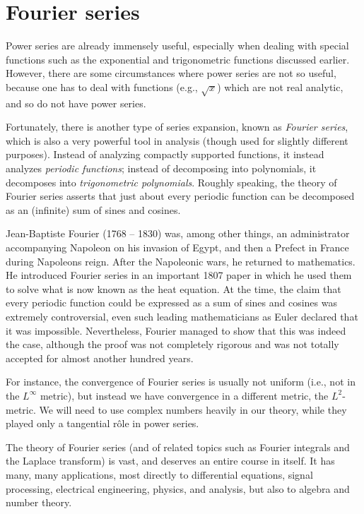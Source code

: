 \chapter{Fourier series}\label{ch 5}

\begin{note}
    Power series are already immensely useful, especially when dealing with special functions such as the exponential and trigonometric functions discussed earlier.
    However, there are some circumstances where power series are not so useful, because one has to deal with functions (e.g., \(\sqrt{x}\)) which are not real analytic, and so do not have power series.
\end{note}

\begin{note}
    Fortunately, there is another type of series expansion, known as \emph{Fourier series}, which is also a very powerful tool in analysis
    (though used for slightly different purposes).
    Instead of analyzing compactly supported functions, it instead analyzes \emph{periodic functions};
    instead of decomposing into polynomials, it decomposes into \emph{trigonometric polynomials}.
    Roughly speaking, the theory of Fourier series asserts that just about every periodic function can be decomposed as an (infinite) sum of sines and cosines.
\end{note}

\begin{remark}\label{5.0.1}
    Jean-Baptiste Fourier (1768 -- 1830) was, among other things, an administrator accompanying Napoleon on his invasion of Egypt, and then a Prefect in France during Napoleons reign.
    After the Napoleonic wars, he returned to mathematics.
    He introduced Fourier series in an important 1807 paper in which he used them to solve what is now known as the heat equation.
    At the time, the claim that every periodic function could be expressed as a sum of sines and cosines was extremely controversial, even such leading mathematicians as Euler declared that it was impossible.
    Nevertheless, Fourier managed to show that this was indeed the case, although the proof was not completely rigorous and was not totally accepted for almost another hundred years.
\end{remark}

\begin{note}
    For instance, the convergence of Fourier series is usually not uniform (i.e., not in the \(L^\infty\) metric), but instead we have convergence in a different metric, the \(L^2\)-metric.
    We will need to use complex numbers heavily in our theory, while they played only a tangential rôle in power series.
\end{note}

\begin{note}
    The theory of Fourier series (and of related topics such as Fourier integrals and the Laplace transform) is vast, and deserves an entire course in itself.
    It has many, many applications, most directly to differential equations, signal processing, electrical engineering, physics, and analysis, but also to algebra and number theory.
\end{note}